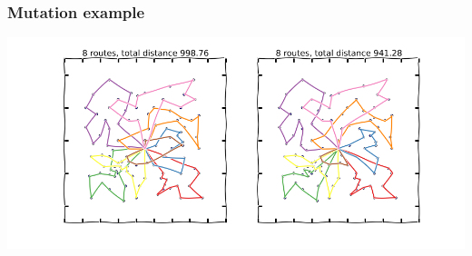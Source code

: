 \documentclass{beamer}
\begin{document}
\begin{frame}
\frametitle{Mutation example}
\begin{center}
\includegraphics[scale=0.3]{figs/mutation}
\end{center}

\end{frame}


%
\end{document}

